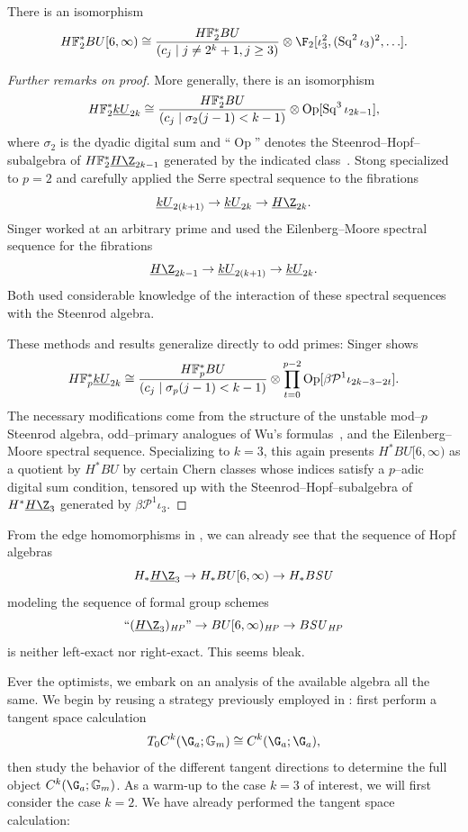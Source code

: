 \begin{theorem}\label{HF2BU6Calculation}
There is an isomorphism \[\HFtwo^* BU[6, \infty) \cong \frac{\HFtwo^* BU}{(c_j \mid j \ne 2^k + 1, j \ge 3)} \otimes \F_2[\iota_3^2, (\Sq^2 \iota_3)^2, \ldots].\]
\end{theorem}
\begin{proof}[Further remarks on proof]
More generally, there is an isomorphism \[\HFtwo^* \OS{kU}{2k} \cong \frac{\HFtwo^* BU}{(c_j \mid \sigma_2(j - 1) < k - 1)} \otimes \operatorname{Op}[\Sq^3 \iota_{2k-1}],\] where \(\sigma_2\) is the dyadic digital sum and ``\(\operatorname{Op}\)'' denotes the Steenrod--Hopf--subalgebra of \(\HFtwo^* \OS{H\Z}{2k-1}\) generated by the indicated class~\cite{Singer,Stong}.
Stong specialized to \(p = 2\) and carefully applied the Serre spectral sequence to the fibrations \[\OS{kU}{2(k+1)} \to \OS{kU}{2k} \to \OS{H\Z}{2k}.\]
Singer worked at an arbitrary prime and used the Eilenberg--Moore spectral sequence for the fibrations \[\OS{H\Z}{2k-1} \to \OS{kU}{2(k+1)} \to \OS{kU}{2k}.\]
Both used considerable knowledge of the interaction of these spectral sequences with the Steenrod algebra.

These methods and results generalize directly to odd primes: Singer shows \[\HFp^* \OS{kU}{2k} \cong \frac{\HFp^* BU}{(c_j \mid \sigma_p(j-1) < k-1)} \otimes \prod_{t=0}^{p-2} \operatorname{Op}[\beta \mathcal P^1 \iota_{2k-3-2t}].\]
The necessary modifications come from the structure of the unstable mod--\(p\) Steenrod algebra, odd--primary analogues of Wu's formulas~\cite{Shay}, and the Eilenberg--Moore spectral sequence.
Specializing to \(k = 3\), this again presents \(H^* BU[6, \infty)\) as a quotient by \(H^* BU\) by certain Chern classes whose indices satisfy a \(p\)--adic digital sum condition, tensored up with the Steenrod--Hopf--subalgebra of \(H^* \OS{H\Z}{3}\) generated by \(\beta \mathcal P^1 \iota_3\).
\end{proof}

From the edge homomorphisms in , we can already see that the sequence of Hopf algebras \[H_* \OS{H\Z}{3} \to H_* BU[6, \infty) \to H_* B\SU\] modeling the sequence of formal group schemes \[\text{``\((\OS{H\Z}{3})_{\mathit{HP}}\)''} \to BU[6, \infty)_{\mathit{HP}} \to B\SU_{\mathit{HP}}\] is neither left-exact nor right-exact.
This seems bleak.

Ever the optimists, we embark on an analysis of the available algebra all the same.
We begin by reusing a strategy previously employed in : first perform a tangent space calculation \[T_0 C^k(\G_a; \Gm) \cong C^k(\G_a; \G_a),\] then study the behavior of the different tangent directions to determine the full object \(C^k(\G_a; \Gm)\).
As a warm-up to the case \(k = 3\) of interest, we will first consider the case \(k = 2\).
We have already performed the tangent space calculation:

